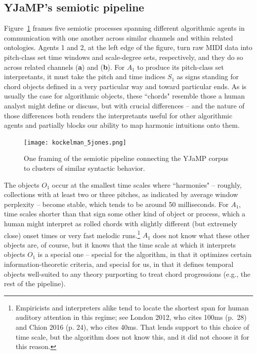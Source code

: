 \subsection{YJaMP's semiotic pipeline}
Figure~\ref{k_j} frames five semiotic processes spanning different algorithmic agents in communication with one another across similar channels and within related ontologies.  Agents 1 and 2, at the left edge of the figure, turn raw MIDI data into pitch-class set time windows and scale-degree sets, respectively, and they do so across related channels (\textbf{a}) and (\textbf{b}).  For $A_1$ to produce its pitch-class set interpretants, it must take the pitch and time indices $S_1$ as signs standing for chord objects defined in a very particular way and toward particular ends.  As is usually the case for algorithmic objects, these ``chords" resemble those a human analyst might define or discuss, but with crucial differences -- and the nature of those differences both renders the interpretants useful for other algorithmic agents and partially blocks our ability to map harmonic intuitions onto them.
\begin{landscape}
\begin{figure}
	\centering
	\caption{One framing of the semiotic pipeline connecting the YJaMP corpus to clusters of similar syntactic behavior.}%
	\label{k_j}
	\texttt{[image: kockelman\_5jones.png]}
\end{figure}
\end{landscape}


The objects $O_1$ occur at the smallest time scales where ``harmonies" -- roughly, collections with at least two or three pitches, as indicated by average window perplexity -- become stable, which tends to be around 50 milliseconds.  For $A_1$, time scales shorter than that sign some other kind of object or process, which a human might interpret as rolled chords with slightly different (but extremely close) onset times or very fast melodic runs.\footnote{Empiricists and interpreters alike tend to locate the shortest span for human auditory attention in this regime; see London 2012, who cites 100ms (p.\ 28) and Chion 2016 (p. 24), who cites 40ms.  That lends support to this choice of time scale, but the algorithm does not know this, and it did not choose it for this reason.}  $A_1$ does not know what these other objects are, of course, but it knows that the time scale at which it interprets objects $O_1$ is a special one -- special for the algorithm, in that it optimizes certain information-theoretic criteria, and special for us, in that it defines temporal objects well-suited to any theory purporting to treat chord progressions (e.g., the rest of the pipeline).

